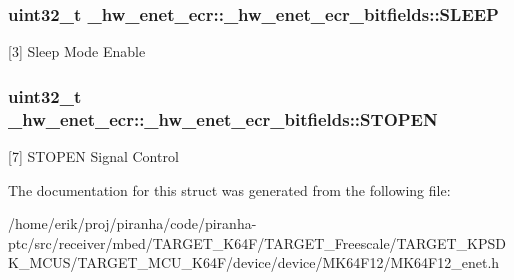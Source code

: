 \subsubsection[{\texorpdfstring{S\+L\+E\+EP}{SLEEP}}]{\setlength{\rightskip}{0pt plus 5cm}uint32\+\_\+t \+\_\+hw\+\_\+enet\+\_\+ecr\+::\+\_\+hw\+\_\+enet\+\_\+ecr\+\_\+bitfields\+::\+S\+L\+E\+EP}\hypertarget{struct__hw__enet__ecr_1_1__hw__enet__ecr__bitfields_a695a4c3640716d44cd895c80b0fef59c}{}\label{struct__hw__enet__ecr_1_1__hw__enet__ecr__bitfields_a695a4c3640716d44cd895c80b0fef59c}
\mbox{[}3\mbox{]} Sleep Mode Enable 
\subsubsection[{\texorpdfstring{S\+T\+O\+P\+EN}{STOPEN}}]{\setlength{\rightskip}{0pt plus 5cm}uint32\+\_\+t \+\_\+hw\+\_\+enet\+\_\+ecr\+::\+\_\+hw\+\_\+enet\+\_\+ecr\+\_\+bitfields\+::\+S\+T\+O\+P\+EN}\hypertarget{struct__hw__enet__ecr_1_1__hw__enet__ecr__bitfields_a4e3efdb81447c668ae6b4404a76536c9}{}\label{struct__hw__enet__ecr_1_1__hw__enet__ecr__bitfields_a4e3efdb81447c668ae6b4404a76536c9}
\mbox{[}7\mbox{]} S\+T\+O\+P\+EN Signal Control 

The documentation for this struct was generated from the following file\+:\begin{DoxyCompactItemize}
\item 
/home/erik/proj/piranha/code/piranha-\/ptc/src/receiver/mbed/\+T\+A\+R\+G\+E\+T\+\_\+\+K64\+F/\+T\+A\+R\+G\+E\+T\+\_\+\+Freescale/\+T\+A\+R\+G\+E\+T\+\_\+\+K\+P\+S\+D\+K\+\_\+\+M\+C\+U\+S/\+T\+A\+R\+G\+E\+T\+\_\+\+M\+C\+U\+\_\+\+K64\+F/device/device/\+M\+K64\+F12/M\+K64\+F12\+\_\+enet.\+h\end{DoxyCompactItemize}
